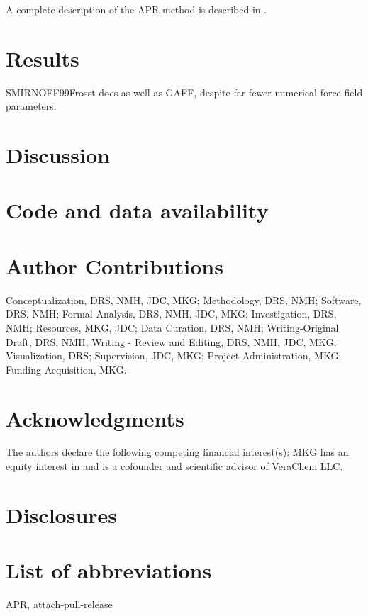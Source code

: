 \documentclass[9pt,lineno]{elife}
\begin{document}
A complete description of the APR method is described in \cite{henriksen_computational_2015}.

\section{Results}
SMIRNOFF99Frosst does as well as GAFF, despite far fewer numerical force field parameters.
\section{Discussion}


\section{Code and data availability}

\section{Author Contributions}
Conceptualization, DRS, NMH, JDC, MKG; Methodology, DRS, NMH; Software, DRS, NMH; Formal Analysis, DRS, NMH, JDC, MKG; Investigation, DRS, NMH; Resources, MKG, JDC;  Data Curation, DRS, NMH; Writing-Original Draft, DRS, NMH; Writing - Review and Editing, DRS, NMH, JDC, MKG; Visualization, DRS; Supervision, JDC, MKG; Project Administration, MKG; Funding Acquisition, MKG.

\section{Acknowledgments}
The authors declare the following competing financial interest(s): MKG has an equity interest in and is a cofounder and scientific advisor of VeraChem LLC.
\section{Disclosures}




\appendix
\section{List of abbreviations}
APR, attach-pull-release
\end{document}
